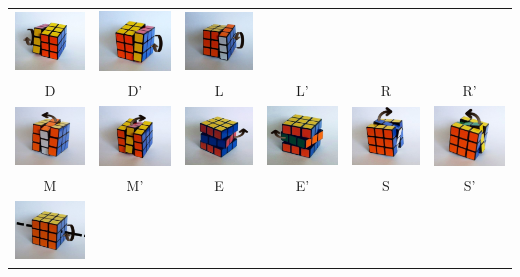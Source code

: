 \documentclass{beamer}
\begin{document}
\begin{frame}
\begin{table}[h]
\begin{tabular}{cccccc}
\includegraphics[width=.12\textwidth]{../graphics/moves/L_inv.png} &
\includegraphics[width=.12\textwidth]{../graphics/moves/R.png} &
\includegraphics[width=.12\textwidth]{../graphics/moves/R_inv.png} \\
D & D' & L & L' & R & R' \\
\includegraphics[width=.12\textwidth]{../graphics/moves/M.png} &
\includegraphics[width=.12\textwidth]{../graphics/moves/M_inv.png} &
\includegraphics[width=.12\textwidth]{../graphics/moves/E.png} &
\includegraphics[width=.12\textwidth]{../graphics/moves/E_inv.png} &
\includegraphics[width=.12\textwidth]{../graphics/moves/S.png} &
\includegraphics[width=.12\textwidth]{../graphics/moves/S_inv.png} \\
M & M' & E & E' & S & S' \\
\includegraphics[width=.12\textwidth]{../graphics/moves/X.png} &

\end{tabular}
\end{table}
\end{frame}
\end{document}
